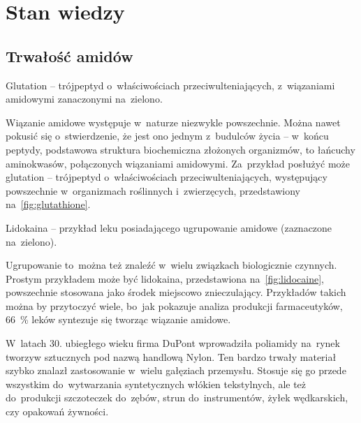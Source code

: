 \chapter{Stan wiedzy}


\section{Trwałość amidów}

\begin{marginfigure}[7\baselineskip]
  
  \caption{
    Glutation \--- trójpeptyd o~właściwościach przeciwulteniających,
    z~wiązaniami amidowymi zanaczonymi na~zielono.
  }
  \label{fig:glutathione}
\end{marginfigure}
Wiązanie amidowe występuje w~naturze niezwykle powszechnie.
Można nawet pokusić się o~stwierdzenie, że jest ono jednym z~budulców życia \---
w~końcu peptydy, podstawowa struktura biochemiczna złożonych organizmów,
to łańcuchy aminokwasów, połączonych wiązaniami amidowymi.
Za~przykład posłużyć może glutation \--- trójpeptyd o~właściwościach przeciwulteniających,
występujący powszechnie w~organizmach roślinnych i~zwierzęcych\autocite{wu04},
przedstawiony na~\cref{fig:glutathione}.
  
\begin{marginfigure}
  
  \caption{
    Lidokaina \--- przykład leku posiadającego ugrupowanie amidowe
    (zaznaczone na~zielono).
  }
  \label{fig:lidocaine}
\end{marginfigure}
Ugrupowanie to~można też znaleźć w~wielu związkach biologicznie czynnych.
Prostym przykładem może być lidokaina, przedstawiona na~\cref{fig:lidocaine},
powszechnie stosowana jako środek miejscowo znieczulający.
Przykładów takich można by przytoczyć wiele, bo~jak pokazuje analiza produkcji farmaceutyków,
\SI{66}{\percent} leków syntezuje się tworząc wiązanie amidowe\autocite{carey06}.

W~latach 30. ubiegłego wieku firma DuPont wprowadziła poliamidy na~rynek tworzyw sztucznych pod nazwą handlową Nylon.
Ten bardzo trwały materiał szybko znalazł zastosowanie w~wielu gałęziach przemysłu.
Stosuje się go przede wszystkim do~wytwarzania syntetycznych włókien tekstylnych,
ale też do~produkcji szczoteczek do~zębów, strun do~instrumentów, żyłek wędkarskich, czy opakowań żywności.

